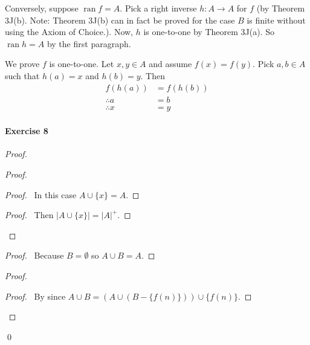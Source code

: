 \documentclass{report}
\newcommand{\ran}{\ensuremath{\operatorname{ran}}}
\begin{document}
    Conversely, suppose $\ran f = A$. Pick a right inverse $h : A \rightarrow A$ for $f$ (by Theorem 3J(b).
    Note: Theorem 3J(b) can in fact be proved for the case $B$ is finite without using the Axiom of Choice.).
    Now, $h$ is one-to-one by Theorem 3J(a). So $\ran h = A$ by the first paragraph.

    We prove $f$ is one-to-one. Let $x,y \in A$ and assume $f(x) = f(y)$. Pick $a, b \in A$ such that
    $h(a) = x$ and $h(b) = y$. Then
    \begin{align*}
        f(h(a)) & = f(h(b)) \\
        \therefore a & = b \\
        \therefore x & = y
    \end{align*}

    \paragraph{Exercise 8}
    \begin{proof}
        \pf
        \begin{proof}
            \begin{proof}
                \pf\ In this case $A \cup \{x\} = A$.
            \end{proof}
            \begin{proof}
                \pf\ Then $|A \cup \{x\}| = |A|^+$.
            \end{proof}
        \end{proof}
        \begin{proof}
            \pf\ Because $B = \emptyset$ so $A \cup B = A$.
        \end{proof}
        \begin{proof}
            \begin{proof}
                \pf\ By  since $A \cup B = (A \cup (B - \{ f(n) \})) \cup \{ f(n) \}$.
            \end{proof}
        \end{proof}
        \qed
    \end{proof}
\end{document}
